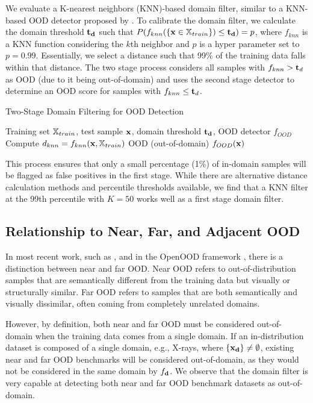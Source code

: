 \documentclass[11pt, oneside]{book}
\theoremstyle{plain}
\theoremstyle{definition}
\theoremstyle{remark}
\begin{document}
We evaluate a K-nearest neighbors (KNN)-based domain filter, similar to a KNN-based OOD detector proposed by \citet{sun2022out}. To calibrate the domain filter, we calculate the domain threshold ${\mathbf{t}}_{\mathbf{d}}$ such that $P(f_{knn}(\{{\mathbf{x}} \in {\mathbb{X}}_{train}\}) \leq {\mathbf{t}}_{\mathbf{d}}) = p$, where $f_{knn}$ is a KNN function considering the $k$th neighbor and $p$ is a hyper parameter set to $p = 0.99$. Essentially, we select a distance such that 99\% of the training data falls within that distance. The two stage process considers all samples with $f_{knn} > {\mathbf{t}}_d$ as OOD (due to it being out-of-domain) and uses the second stage detector to determine an OOD score for samples with $f_{knn} \leq {\mathbf{t}}_d$.

\begin{algorithm}
\caption{Two-Stage Domain Filtering for OOD Detection}
\label{alg:domainfiltering}
\begin{algorithmic}[1]
\Require Training set ${\mathbb{X}}_{train}$, test sample ${\mathbf{x}}$, domain threshold ${\mathbf{t}}_{\mathbf{d}}$, OOD detector $f_{OOD}$
\State Compute $d_{knn} = f_{knn}({\mathbf{x}}, {\mathbb{X}}_{train})$ 
    \State \Return OOD (out-of-domain)
\Else
    \State \Return $f_{OOD}({\mathbf{x}})$ 
\EndIf
\end{algorithmic}
\end{algorithm}

This process ensures that only a small percentage (1\%) of in-domain samples will be flagged as false positives in the first stage. While there are alternative distance calculation methods and percentile thresholds available, we find that a KNN filter at the 99th percentile with $K = 50$ works well as a first stage domain filter.

\subsection{Relationship to Near, Far, and Adjacent OOD}

In most recent work, such as \citet{fort2021exploring}, and in the OpenOOD framework \citep{yang2022openood, zhang2023openood}, there is a distinction between near and far OOD. Near OOD refers to out-of-distribution samples that are semantically different from the training data but visually or structurally similar. Far OOD refers to samples that are both semantically and visually dissimilar, often coming from completely unrelated domains.

However, by definition, both near and far OOD must be considered out-of-domain when the training data comes from a single domain. If an in-distribution dataset is composed of a single domain, e.g., X-rays, where $\{{\mathbf{x}}_{\mathbf{d}}\} \neq \emptyset$, existing near and far OOD benchmarks will be considered out-of-domain, as they would not be considered in the same domain by $f_{\mathbf{d}}$. We observe that the domain filter is very capable at detecting both near and far OOD benchmark datasets as out-of-domain.
\end{document}
